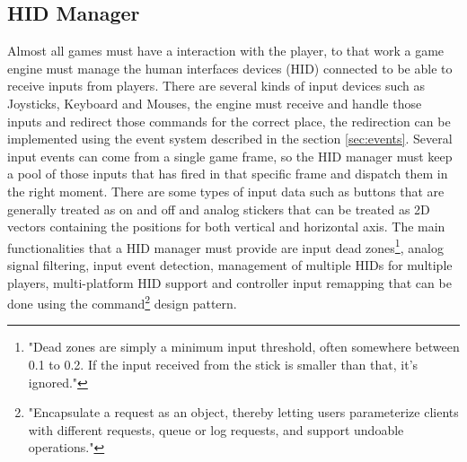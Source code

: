 \subsection{HID Manager}
Almost all games must have a interaction with the player, to that work a game engine must manage the human interfaces devices (HID) connected to be able to receive inputs from players\cite{GameEngineArchitecture}. There are several kinds of input devices such as Joysticks, Keyboard and Mouses, the engine must receive and handle those inputs and redirect those commands for the correct place, the redirection can be implemented using the event system described in the section \ref{sec:events}\cite{GameProgrammingPatterns}. Several input events can come from a single game frame, so the HID manager must keep a pool of those inputs that has fired in that specific frame and dispatch them in the right moment\cite{GameEngineArchitecture}. There are some types of input data such as buttons that are generally treated as on and off and analog stickers that can be treated as 2D vectors containing the positions for both vertical and horizontal axis. The main functionalities that a HID manager must provide are input dead zones\footnote{"Dead zones are simply a minimum input threshold, often somewhere between 0.1 to 0.2. If the input received from the stick is smaller than that, it’s ignored."\cite{DeadZones}}, analog signal filtering, input event detection, management of multiple HIDs for multiple players, multi-platform HID support and controller input remapping that can be done using the command\footnote{"Encapsulate a request as an object, thereby letting users parameterize clients with different requests, queue or log requests, and support undoable operations."\cite{GameProgrammingPatterns}} design pattern\cite{GameEngineArchitecture, GameProgrammingPatterns}.
